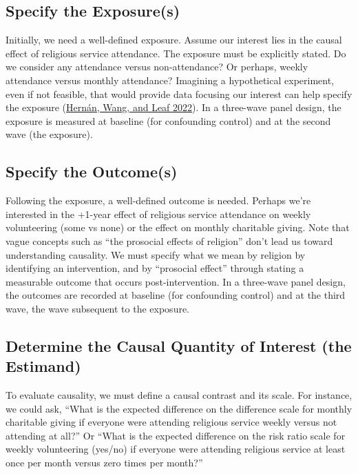 \documentclass[
  singlecolumn]{report}
\begin{document}
\hypertarget{specify-the-exposures}{%
\subsection{\texorpdfstring{\textbf{Specify the
Exposure(s)}}{Specify the Exposure(s)}}\label{specify-the-exposures}}

Initially, we need a well-defined exposure. Assume our interest lies in
the causal effect of religious service attendance. The exposure must be
explicitly stated. Do we consider any attendance versus non-attendance?
Or perhaps, weekly attendance versus monthly attendance? Imagining a
hypothetical experiment, even if not feasible, that would provide data
focusing our interest can help specify the exposure
(\protect\hyperlink{ref-hernuxe1n2022a}{Hernán, Wang, and Leaf 2022}).
In a three-wave panel design, the exposure is measured at baseline (for
confounding control) and at the second wave (the exposure).

\hypertarget{specify-the-outcomes}{%
\subsection{\texorpdfstring{\textbf{Specify the
Outcome(s)}}{Specify the Outcome(s)}}\label{specify-the-outcomes}}

Following the exposure, a well-defined outcome is needed. Perhaps we're
interested in the +1-year effect of religious service attendance on
weekly volunteering (some vs none) or the effect on monthly charitable
giving. Note that vague concepts such as ``the prosocial effects of
religion'' don't lead us toward understanding causality. We must specify
what we mean by religion by identifying an intervention, and by
``prosocial effect'' through stating a measurable outcome that occurs
post-intervention. In a three-wave panel design, the outcomes are
recorded at baseline (for confounding control) and at the third wave,
the wave subsequent to the exposure.

\hypertarget{determine-the-causal-quantity-of-interest-the-estimand}{%
\subsection{\texorpdfstring{\textbf{Determine the Causal Quantity of
Interest (the
Estimand)}}{Determine the Causal Quantity of Interest (the Estimand)}}\label{determine-the-causal-quantity-of-interest-the-estimand}}

To evaluate causality, we must define a causal contrast and its scale.
For instance, we could ask, ``What is the expected difference on the
difference scale for monthly charitable giving if everyone were
attending religious service weekly versus not attending at all?'' Or
``What is the expected difference on the risk ratio scale for weekly
volunteering (yes/no) if everyone were attending religious service at
least once per month versus zero times per month?''
\end{document}
